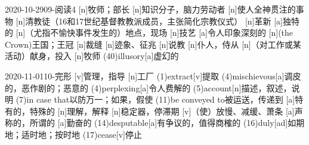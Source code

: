 \documentclass[12pt]{ctexart}
\begin{document}
\begin{wordlist}{2020-10-29}{09-阅读4}
  [n]{牧师；部长}
  [n]{知识分子，脑力劳动者}
  [n]{使人全神贯注的事物}
  [n]{清教徒（16和17世纪基督教教派成员，主张简化宗教仪式）}
  [n]{革新}
  [a]{独特的}
  [n]{（尤指不愉快事件发生的）地点，现场}
  [n]{技艺}
  [a]{令人印象深刻的}
  [n]{(the Crown)王国；王冠}
  [n]{裁缝}
  [n]{迹象、征兆}
  [n]{说教}
  [n]{仆人，侍从}
  [n]{（对工作或某活动）献身，投入}
  [n]{牧师}
  \word(40){illusory}[a]{虚幻的}
\end{wordlist}

\begin{wordlist}{2020-11-01}{10-完形}
  [v]{管理，指导}
  [n]{工厂}
  \word(1){extract}[v]{提取}
  \word[2020-11-03](4){mischievous}[a]{调皮的，恶作剧的；恶意的}
  \word[2020-11-03](4){perplexing}[a]{令人费解的}
  \word(5){account}[n]{描述，叙述，说明}
  \word(7){in case that}{以防万一；如果，假使}
  \word(11){be conveyed to}{被运送，传递到}
  [a]{特有的，特殊的}
  [n]{理解，解释}
  [n]{稳定器，停滞期}
  [v]{（使）放慢、减缓、萧条}
  [a]{声称的，所谓的}
  [a]{勤奋的}
  \word[2020-11-03](14){desputable}[a]{有争议的，值得商榷的}
  \word(16){duly}[ad]{如期地；适时地；按时地}
  \word[2020-11-03](17){cease}[v]{停止}
\end{wordlist}
\end{document}
